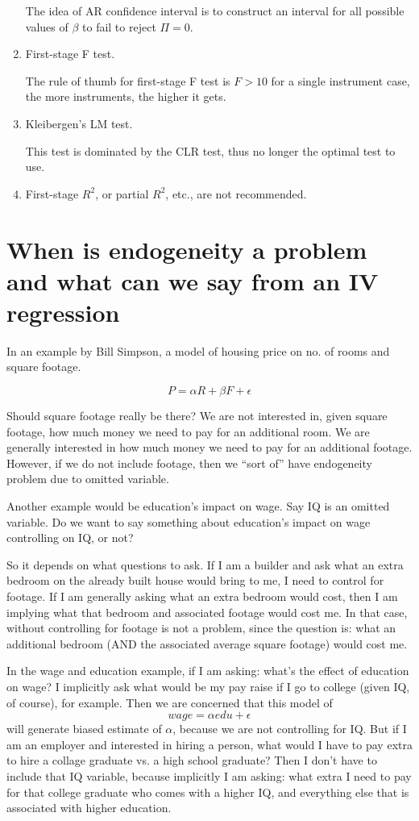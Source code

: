 \begin{enumerate}
The idea of AR confidence interval is to construct an interval for all
possible values of $\beta$ to fail to reject $\Pi=0$. 

\item First-stage F test.

The rule of thumb for first-stage F test is $F>10$ for a single
instrument case, the more instruments, the higher it gets.

\item Kleibergen's LM test.

This test is dominated by the CLR test, thus no longer the optimal
test to use.

\item First-stage $R^2$, or partial $R^2$, etc., are not recommended.

\end{enumerate}


\section{When is endogeneity a problem and what can we say from an IV regression}

In an example by Bill Simpson,   a model of housing price on no. of rooms
and square footage.

\[ P = \alpha R + \beta F + \epsilon \]  

Should square footage really be there?  We are not interested in,
given square footage, how much money we need to pay for an additional
room.  We are generally interested in how much money we need to pay
for an additional footage.  However, if we do not include footage,
then we ``sort of'' have endogeneity problem due to omitted variable.  

Another example would be education's impact on wage.  Say IQ is an
omitted variable.  Do we want to say something about education's
impact on wage controlling on IQ, or not?

So it depends on what questions to ask.  If I am a builder and ask
what an extra bedroom on the already built house would bring to me, I
need to control for footage.  If I am generally asking what an extra
bedroom would cost, then I am implying what that bedroom and
associated footage would cost me.  In that case, without controlling
for footage is not a problem, since the question is:  what an
additional bedroom (AND the associated average square footage) would
cost me.

In the wage and education example, if I am asking: what's the effect
of education on wage?  I implicitly ask what would be my pay raise if
I go to college (given IQ, of course), for example.  Then we are
concerned that this model of
\[ wage= \alpha edu + \epsilon \] 
will generate biased estimate of $\alpha$, because we are not
controlling for IQ.  But if I am an employer and interested in hiring
a person, what would I have to pay extra to hire a collage graduate
vs. a high school graduate?  Then I don't have to include that IQ
variable, because implicitly I am asking: what extra I need to pay for
that college graduate who comes with a higher IQ, and everything else
that is associated with higher education.


